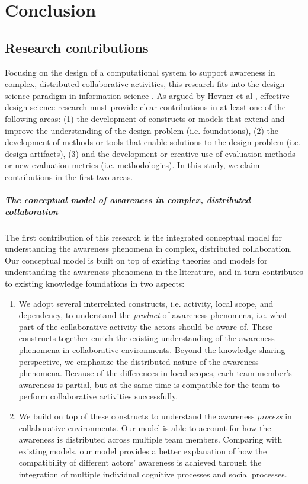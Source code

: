\graphicspath{{Figures/}}

\chapter{Conclusion} %
\label{cha:conclusion}
\section{Research contributions} %
\label{sec:contributions}
Focusing on the design of a computational system to support awareness in complex, distributed collaborative activities, this research fits into the design-science paradigm in information science \cite{Hevner2004}. As argued by Hevner et al \cite{Hevner2004}, effective design-science research must provide clear contributions in at least one of the following areas: (1) the development of constructs or models that extend and improve the understanding of the design problem (i.e. foundations), (2) the development of methods or tools that enable solutions to the design problem (i.e. design artifacts), (3) and the development or creative use of evaluation methods or new evaluation metrics (i.e. methodologies). In this study, we claim contributions in the first two areas. 

\paragraph*{The conceptual model of awareness in complex, distributed collaboration} %
\label{par:a_conceptual_model_of_awareness_in_complex_collaborations}
The first contribution of this research is the integrated conceptual model for understanding the awareness phenomena in complex, distributed collaboration. Our conceptual model is built on top of existing theories and models for understanding the awareness phenomena in the literature, and in turn contributes to existing knowledge foundations in two aspects:

\begin{enumerate}
	\item We adopt several interrelated constructs, i.e. activity, local scope, and dependency, to understand the \emph{product} of awareness phenomena, i.e. what part of the collaborative activity the actors should be aware of. These constructs together enrich the existing understanding of the awareness phenomena in collaborative environments. Beyond the knowledge sharing perspective, we emphasize the distributed nature of the awareness phenomena. Because of the differences in local scopes, each team member's awareness is partial, but at the same time is compatible for the team to perform collaborative activities successfully.
	\item We build on top of these constructs to understand the awareness \emph{process} in collaborative environments. Our model is able to account for how the awareness is distributed across multiple team members. Comparing with existing models, our model provides a better explanation of how the compatibility of different actors' awareness is achieved through the integration of multiple individual cognitive processes and social processes.
\end{enumerate}

